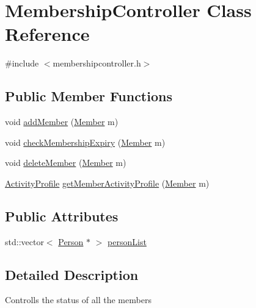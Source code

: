 \hypertarget{class_membership_controller}{\section{Membership\-Controller Class Reference}
\label{class_membership_controller}
}


{\ttfamily \#include $<$membershipcontroller.\-h$>$}

\subsection*{Public Member Functions}
\begin{DoxyCompactItemize}
\item 
void \hyperlink{class_membership_controller_a5dee58ec4865052d85156b9f042b429c}{add\-Member} (\hyperlink{class_member}{Member} m)
\item 
void \hyperlink{class_membership_controller_acfdd3d9ccaa56cf6f41c4237c2d47f14}{check\-Membership\-Expiry} (\hyperlink{class_member}{Member} m)
\item 
void \hyperlink{class_membership_controller_af26d202b3274cfff1d2bb8cb2b2f0784}{delete\-Member} (\hyperlink{class_member}{Member} m)
\item 
\hyperlink{class_activity_profile}{Activity\-Profile} \hyperlink{class_membership_controller_a15765068736138fadf8837a7a7a05ad2}{get\-Member\-Activity\-Profile} (\hyperlink{class_member}{Member} m)
\end{DoxyCompactItemize}
\subsection*{Public Attributes}
\begin{DoxyCompactItemize}
\item 
std\-::vector$<$ \hyperlink{class_person}{Person} $\ast$ $>$ \hyperlink{class_membership_controller_ab1ba5783f942d4df197a6d6b35ff40ee}{person\-List}
\end{DoxyCompactItemize}


\subsection{Detailed Description}
Controlls the status of all the members 

